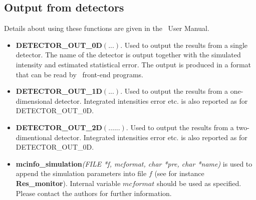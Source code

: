\subsection{Output from detectors}
Details about using these functions are given in the \MCX\ User Manual.
\begin{itemize}
\item {\bfseries DETECTOR\_OUT\_0D}$(...)$. Used to output the results from a
  single detector. The name of the detector is output together
  with the simulated intensity and estimated statistical error. The
  output is produced in a format that can be read by \MCX\ front-end
  programs.
\item {\bfseries DETECTOR\_OUT\_1D}$(...)$. Used to output the results from a
  one-dimensional detector. Integrated intensities error etc. is also
  reported as for DETECTOR\_OUT\_0D.
\item {\bfseries DETECTOR\_OUT\_2D}$(\dots...)$. Used to output the results from a
  two-dimentional detector. Integrated intensities error etc. is also
  reported as for DETECTOR\_OUT\_0D.
\item {\bfseries mcinfo\_simulation}\textit{(FILE *f, mcformat,
  char *pre, char *name)} is used to append the simulation parameters into file $f$
  (see for instance {\bfseries Res\_monitor}).
  Internal variable $mcformat$ should be used as specified.
  Please contact the authors for further information.
\end{itemize}

